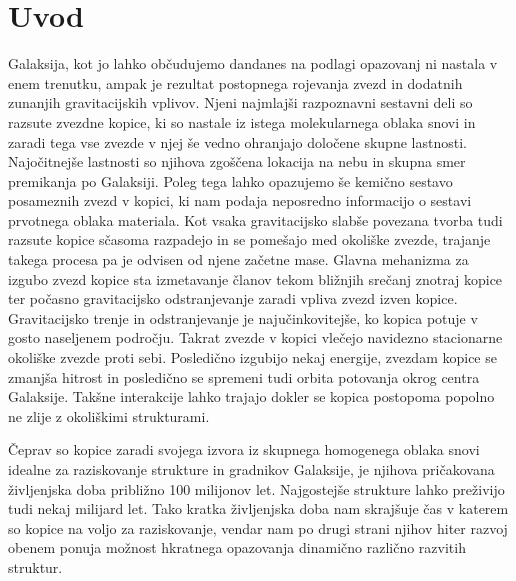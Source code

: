 
\section{Uvod}
\label{sec:slo_uvod}
Galaksija, kot jo lahko občudujemo dandanes na podlagi opazovanj ni nastala v enem trenutku, ampak je rezultat postopnega rojevanja zvezd in dodatnih zunanjih gravitacijskih vplivov. Njeni najmlajši razpoznavni sestavni deli so razsute zvezdne kopice, ki so nastale iz istega molekularnega oblaka snovi in zaradi tega vse zvezde v njej še vedno ohranjajo določene skupne lastnosti. Najočitnejše lastnosti so njihova zgoščena lokacija na nebu in skupna smer premikanja po Galaksiji. Poleg tega lahko opazujemo še kemično sestavo posameznih zvezd v kopici, ki nam podaja neposredno informacijo o sestavi prvotnega oblaka materiala. Kot vsaka gravitacijsko slabše povezana tvorba tudi razsute kopice sčasoma razpadejo in se pomešajo med okoliške zvezde, trajanje takega procesa pa je odvisen od njene začetne mase. Glavna mehanizma za izgubo zvezd kopice sta izmetavanje članov tekom bližnjih srečanj znotraj kopice ter počasno gravitacijsko odstranjevanje zaradi vpliva zvezd izven kopice. Gravitacijsko trenje in odstranjevanje je najučinkovitejše, ko kopica potuje v gosto naseljenem področju. Takrat zvezde v kopici vlečejo navidezno stacionarne okoliške zvezde proti sebi. Posledično izgubijo nekaj energije, zvezdam kopice se zmanjša hitrost in posledično se spremeni tudi orbita potovanja okrog centra Galaksije. Takšne interakcije lahko trajajo dokler se kopica postopoma popolno ne zlije z okoliškimi strukturami.

Čeprav so kopice zaradi svojega izvora iz skupnega homogenega oblaka snovi idealne za raziskovanje strukture in gradnikov Galaksije, je njihova pričakovana življenjska doba približno 100 milijonov let. Najgostejše strukture lahko preživijo tudi nekaj milijard let. Tako kratka življenjska doba nam skrajšuje čas v katerem so kopice na voljo za raziskovanje, vendar nam po drugi strani njihov hiter razvoj obenem ponuja možnost hkratnega opazovanja dinamično različno razvitih struktur.

